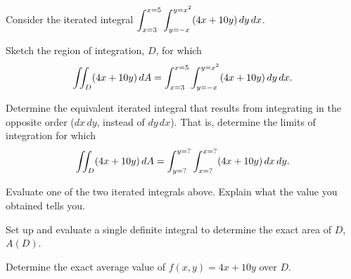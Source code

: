 \begin{activity} \label{A:11.3.2} Consider the iterated integral $\displaystyle \int_{x=3}^{x=5} \int_{y=-x}^{y=x^2} (4x+10y) \, dy \, dx$.
    \ba
    \item Sketch the region of integration, $D$, for which 
    $$\displaystyle \iint_D (4x + 10y) \, dA = \int_{x=3}^{x=5} \int_{y=-x}^{y=x^2} (4x+10y) \, dy \, dx.$$

    \item Determine the equivalent iterated integral that results from integrating in the opposite order ($dx \, dy$, instead of $dy \, dx$).  That is, determine the limits of integration for which 
$$\displaystyle \iint_D (4x + 10y) \, dA = \int_{y=?}^{y=?}  \int_{x=?}^{x=?} (4x+10y) \, dx \, dy.$$
    \item Evaluate one of the two iterated integrals above. Explain what the value you obtained tells you.
    
    \item Set up and evaluate a single definite integral to determine the exact area of $D$, $A(D)$.
    
    \item Determine the exact average value of $f(x,y) = 4x  + 10y$ over $D$.

    \ea

\end{activity}
\begin{smallhint}

\end{smallhint}
\begin{bighint}

\end{bighint}
